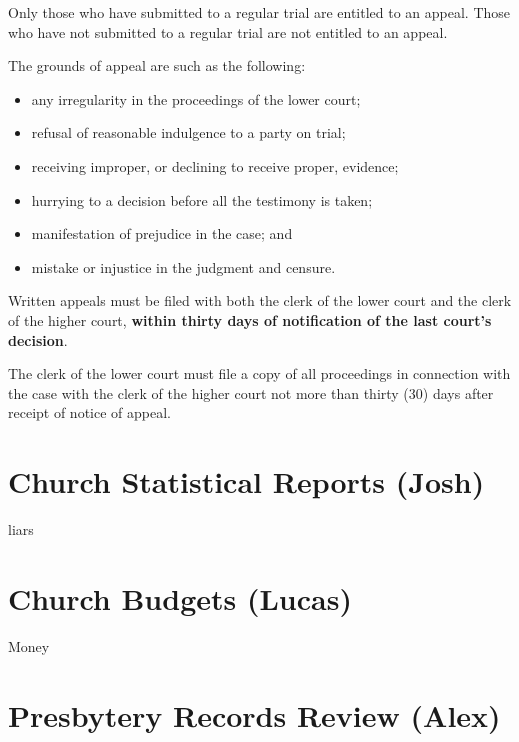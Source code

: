 \documentclass[
]{book}
\providecommand{\tightlist}{%
  \setlength{\itemsep}{0pt}\setlength{\parskip}{0pt}}
\begin{document}
Only those who have submitted to a regular trial are entitled to an appeal. Those who have not submitted to a regular trial are not entitled to an appeal.

The grounds of appeal are such as the following:

\begin{itemize}
\tightlist
\item
  any irregularity in the proceedings of the lower court;
\item
  refusal of reasonable indulgence to a party on trial;
\item
  receiving improper, or declining to receive proper, evidence;
\item
  hurrying to a decision before all the testimony is taken;
\item
  manifestation of prejudice in the case; and
\item
  mistake or injustice in the judgment and censure.
\end{itemize}

Written appeals must be filed with both the clerk of the lower court and the clerk of the higher court, \textbf{within thirty days of notification of the last court's decision}.

The clerk of the lower court must file a copy of all proceedings in connection with the case with the clerk of the higher court not more than thirty (30) days after receipt of notice of appeal.

\hypertarget{church-statistical-reports-josh}{%
\chapter{Church Statistical Reports (Josh)}\label{church-statistical-reports-josh}}

liars

\hypertarget{church-budgets-lucas}{%
\chapter{Church Budgets (Lucas)}\label{church-budgets-lucas}}

Money

\hypertarget{presbytery-records-review-alex}{%
\chapter{Presbytery Records Review (Alex)}\label{presbytery-records-review-alex}}
\end{document}
